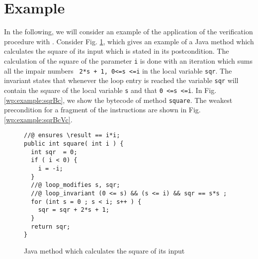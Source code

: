 \section{Example}\label{wp:example}
In the following, we will consider an example of the application of the verification procedure 
with \fwpi.
Consider Fig. \ref{wp:example:sqrSrc}, which gives an example of a Java method which calculates the square of its input which is stated in its postcondition.
The calculation of the square of the parameter  \lstinline!i!  is done with an iteration which sums all the impair numbers  \lstinline! 2*s + 1, 0<=s <=i! 
 in the local variable \lstinline!sqr!. The invariant states that whenever the loop entry is reached the variable 
  \lstinline!sqr! will contain the square of the local variable  \lstinline!s! and that \lstinline!0 <=s <=i!. 
In Fig.\ref{wp:example:sqrBc}, we show the bytecode of method \lstinline!square!. 
The weakest precondition for a fragment of  the instructions are shown in Fig. \ref{wp:example:sqrBcVc}. 





\begin{figure}
\begin{lstlisting}[frame=trbl]
//@ ensures \result == i*i; 
public int square( int i ) { 
  int sqr  = 0;
  if ( i < 0) {
    i = -i;
  }
  //@ loop_modifies s, sqr;
  //@ loop_invariant (0 <= s) && (s <= i) && sqr == s*s ;
  for (int s = 0 ; s < i; s++ ) {
    sqr = sqr + 2*s + 1;
  }
  return sqr;
}

\end{lstlisting} 
\caption{\sc Java method which calculates the square of its input  }
\label{wp:example:sqrSrc}
\end{figure}


